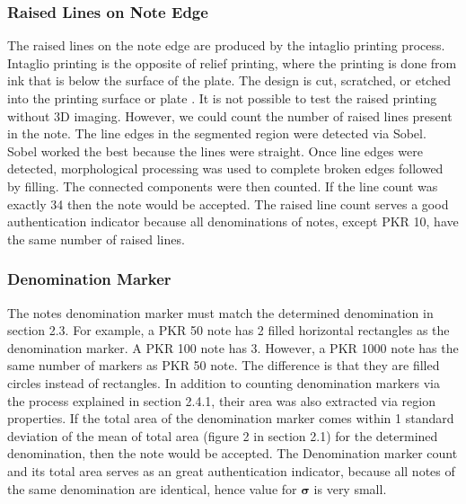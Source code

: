 \documentclass{article}
\begin{document}
\subsubsection{Raised Lines on Note Edge}
The raised lines on the note edge are produced by the intaglio printing process. Intaglio printing is the opposite of relief printing, where the printing is done from ink that is below the surface of the plate. The design is cut, scratched, or etched into the printing surface or plate \cite{ScaleUp_MLSP:13}. It is not possible to test the raised printing without 3D imaging. However, we could count the number of raised lines present in the note. The line edges in the segmented region were detected via Sobel. Sobel worked the best because the lines were straight. Once line edges were detected, morphological processing was used to complete broken edges followed by filling. The connected components were then counted. If the line count was exactly 34 then the note would be accepted. The raised line count serves a good authentication indicator because all denominations of notes, except PKR 10, have the same number of raised lines. 

\subsubsection{Denomination Marker}
The notes denomination marker must match the determined denomination in section 2.3. For example, a PKR 50 note has 2 filled horizontal rectangles as the denomination marker. A PKR 100 note has 3. However, a PKR 1000 note has the same number of markers as PKR 50 note. The difference is that they are filled circles instead of rectangles. In addition to counting denomination markers via the process explained in section 2.4.1, their area was also extracted via region properties. If the total area of the denomination marker comes within 1 standard deviation of the mean of total area (figure 2 in section 2.1) for the determined denomination, then the note would be accepted. The Denomination marker count and its total area serves as an great authentication indicator, because all notes of the same denomination are identical, hence value for $\mathbf{\sigma}$ is very small.
\end{document}
